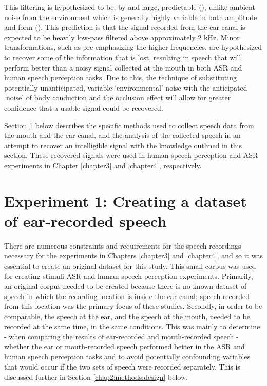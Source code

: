 This filtering is hypothesized to be, by and large, predictable (\cite{hansen:97b,reinfeldt:10}), unlike ambient noise from the environment which is generally highly variable in both amplitude and form (\cite{zhang:17}). This prediction is that the signal recorded from the ear canal is expected to be heavily low-pass filtered above approximately 2 kHz.  Minor transformations, such as pre-emphasizing the higher frequencies, are hypothesized to recover some of the information that is lost, resulting in speech that will perform better than a noisy signal collected at the mouth in both ASR and human speech perception tasks.
Due to this, the technique of substituting potentially unanticipated, variable `environmental' noise with the anticipated `noise' of body conduction and the occlusion effect will allow for greater confidence that a usable signal could be recovered. 

Section \ref{expt1} below describes the specific methods used to collect speech data from the mouth and the ear canal, and the analysis of the collected speech in an attempt to recover an intelligible signal with the knowledge outlined in this section.  These recovered signals were used in human speech perception and ASR experiments in Chapter \ref{chapter3} and \ref{chapter4}, respectively.


\section{Experiment 1: Creating a dataset of ear-recorded speech}\label{expt1}

There are numerous constraints and requirements for the speech recordings necessary for the experiments in Chapters \ref{chapter3} and \ref{chapter4}, and so it was essential to create an original dataset for this study.  This small corpus was used for creating stimuli ASR and human speech perception experiments.  Primarily, an original corpus needed to be created because there is no known dataset of speech in which the recording location is inside the ear canal; speech recorded from this location was the primary focus of these studies.  Secondly, in order to be comparable, the speech at the ear, and the speech at the mouth, needed to be recorded at the same time, in the same conditions.  This was mainly to determine - when comparing the results of ear-recorded and mouth-recorded speech - whether the ear or mouth-recorded speech performed better in the ASR and human speech perception tasks and to avoid potentially confounding variables that would occur if the two sets of speech were recorded separately. This is discussed further in Section \ref{chap2:methods:design} below.

